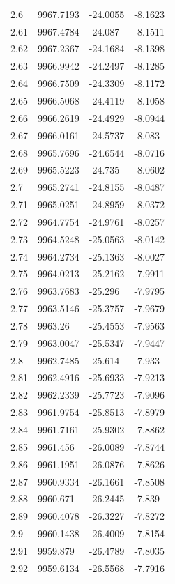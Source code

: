 \begin{table}[H]
\begin{tabular}{llll}
2.6 & 9967.7193 & -24.0055 & -8.1623 \\
2.61 & 9967.4784 & -24.087 & -8.1511 \\
2.62 & 9967.2367 & -24.1684 & -8.1398 \\
2.63 & 9966.9942 & -24.2497 & -8.1285 \\
2.64 & 9966.7509 & -24.3309 & -8.1172 \\
2.65 & 9966.5068 & -24.4119 & -8.1058 \\
2.66 & 9966.2619 & -24.4929 & -8.0944 \\
2.67 & 9966.0161 & -24.5737 & -8.083 \\
2.68 & 9965.7696 & -24.6544 & -8.0716 \\
2.69 & 9965.5223 & -24.735 & -8.0602 \\
2.7 & 9965.2741 & -24.8155 & -8.0487 \\
2.71 & 9965.0251 & -24.8959 & -8.0372 \\
2.72 & 9964.7754 & -24.9761 & -8.0257 \\
2.73 & 9964.5248 & -25.0563 & -8.0142 \\
2.74 & 9964.2734 & -25.1363 & -8.0027 \\
2.75 & 9964.0213 & -25.2162 & -7.9911 \\
2.76 & 9963.7683 & -25.296 & -7.9795 \\
2.77 & 9963.5146 & -25.3757 & -7.9679 \\
2.78 & 9963.26 & -25.4553 & -7.9563 \\
2.79 & 9963.0047 & -25.5347 & -7.9447 \\
2.8 & 9962.7485 & -25.614 & -7.933 \\
2.81 & 9962.4916 & -25.6933 & -7.9213 \\
2.82 & 9962.2339 & -25.7723 & -7.9096 \\
2.83 & 9961.9754 & -25.8513 & -7.8979 \\
2.84 & 9961.7161 & -25.9302 & -7.8862 \\
2.85 & 9961.456 & -26.0089 & -7.8744 \\
2.86 & 9961.1951 & -26.0876 & -7.8626 \\
2.87 & 9960.9334 & -26.1661 & -7.8508 \\
2.88 & 9960.671 & -26.2445 & -7.839 \\
2.89 & 9960.4078 & -26.3227 & -7.8272 \\
2.9 & 9960.1438 & -26.4009 & -7.8154 \\
2.91 & 9959.879 & -26.4789 & -7.8035 \\
2.92 & 9959.6134 & -26.5568 & -7.7916 \\

\end{tabular}
\end{table}
